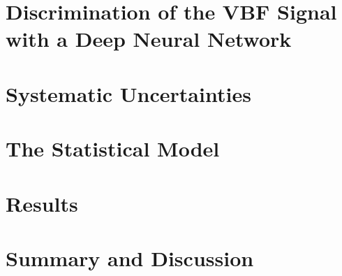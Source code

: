 \section{Discrimination of the VBF Signal with a Deep Neural Network}
\label{sec:dnn}



\section{Systematic Uncertainties}
\label{sec:systematics}



\section{The Statistical Model}
\label{sec:stats-analysis}



\section{Results}
\label{sec:hww-results}


\section{Summary and Discussion}
\label{sec:hww:summary}

